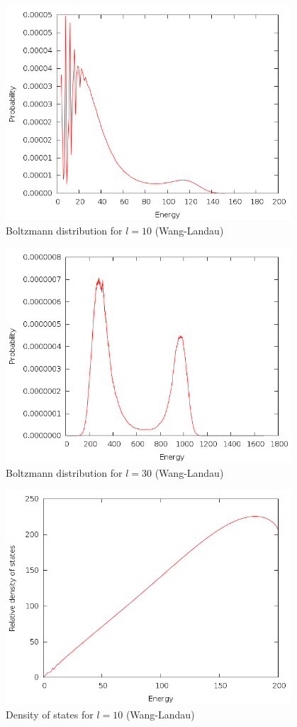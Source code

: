 \documentclass{article}
\begin{document}
\begin{figure}[h]
\includegraphics[height=8cm]{../results/wanglandau/b10.png}
\caption{Boltzmann distribution for $l = 10$ (Wang-Landau)}
\label{fig:b10}
\end{figure}

\begin{figure}[h]
\includegraphics[height=8cm]{../results/wanglandau/b30.png}
\caption{Boltzmann distribution for $l = 30$ (Wang-Landau)}
\label{fig:b30}
\end{figure}

\begin{figure}[h]
\includegraphics[height=8cm]{../results/wanglandau/s10.png}
\caption{Density of states for $l = 10$ (Wang-Landau)}
\label{fig:s10}
\end{figure}
\end{document}

